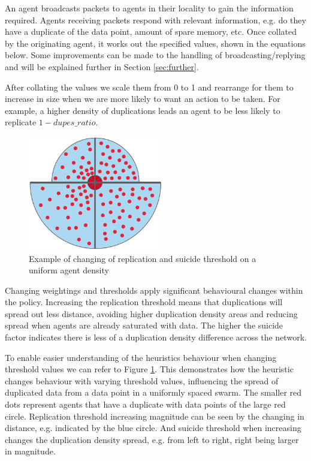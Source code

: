 \documentclass{UoYCSproject}
\begin{document}
An agent broadcasts packets to agents in their locality to gain the information required.
Agents receiving packets respond with relevant information, e.g. do they have a duplicate of the data point, amount of spare memory, etc.
Once collated by the originating agent, it works out the specified values, shown in the equations below.
Some improvements can be made to the handling of broadcasting/replying and will be explained further in Section \ref{sec:further}.

After collating the values we scale them from 0 to 1 and rearrange for them to increase in size when we are more likely to want an action to be taken.
For example, a higher density of duplications leads an agent to be less likely to replicate $1-dupes\_ratio$.

\begin{figure}[htb]
\label{fig:changing}
\begin{center}
\centering
\includegraphics[height=5cm]{"./ExplanationImgs/planned_changes.png"}
\caption{Example of changing of replication and suicide threshold on a uniform agent density}
\end{center}
\end{figure}

Changing weightings and thresholds apply significant behavioural changes within the policy.
Increasing the replication threshold means that duplications will spread out less distance, avoiding higher duplication density areas and reducing spread when agents are already saturated with data.
The higher the suicide factor indicates there is less of a duplication density difference across the network.

To enable easier understanding of the heuristics behaviour when changing threshold values we can refer to Figure \ref{fig:changing}.
This demonstrates how the heuristic changes behaviour with varying threshold values, influencing the spread of duplicated data from a data point in a uniformly spaced swarm.
The smaller red dots represent agents that have a duplicate with data points of the large red circle.
Replication threshold increasing magnitude can be seen by the changing in distance, e.g. indicated by the blue circle.
And suicide threshold when increasing changes the duplication density spread, e.g. from left to right, right being larger in magnitude.
\end{document}

